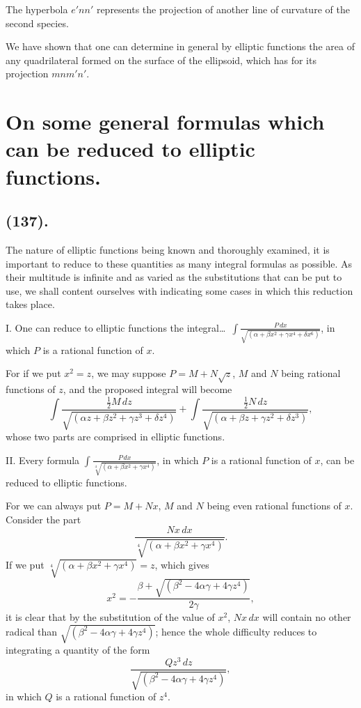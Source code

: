 \documentclass{article}
\begin{document}
The hyperbola $e'nn'$ represents the projection of another line of curvature of the second species.

We have shown that one can determine in general by elliptic functions the area of any quadrilateral formed on the surface of the ellipsoid, which has for its projection $mnm'n'$.

\section*{On some general formulas which can be reduced to elliptic functions.}

\subsection*{(137).}

The nature of elliptic functions being known and thoroughly examined, it is important to reduce to these quantities as many integral formulas as possible. As their multitude is infinite and as varied as the substitutions that can be put to use, we shall content ourselves with indicating some cases in which this reduction takes place.

I. One can reduce to elliptic functions the integral\ldots\ $\displaystyle\int\frac{P\,dx}{\sqrt{(\alpha+\beta x^{2}+\gamma x^{4}+\delta x^{6})}}$, in which $P$ is a rational function of $x$.

For if we put $x^{2}=z$, we may suppose $P=M+N\sqrt{z}$, $M$ and $N$ being rational functions of $z$, and the proposed integral will become
\[ \int\frac{\tfrac{1}{2}M\,dz}{\sqrt{(\alpha z+\beta z^{2}+\gamma z^{3}+\delta z^{4})}}+\int\frac{\tfrac{1}{2}N\,dz}{\sqrt{(\alpha+\beta z+\gamma z^{2}+\delta z^{3})}}, \]
whose two parts are comprised in elliptic functions.

II. Every formula $\displaystyle\int\frac{P\,dx}{\sqrt[4]{(\alpha+\beta x^{2}+\gamma x^{4})}}$, in which $P$ is a rational function of $x$, can be reduced to elliptic functions.

For we can always put $P=M+Nx$, $M$ and $N$ being even rational functions of $x$. Consider the part
\[ \frac{Nx\,dx}{\sqrt[4]{(\alpha+\beta x^{2}+\gamma x^{4})}}. \]
If we put $\sqrt[4]{(\alpha+\beta x^{2}+\gamma x^{4})}=z$, which gives
\[ x^{2}=-\frac{\beta+\sqrt{(\beta^{2}-4\alpha\gamma+4\gamma z^{4})}}{2\gamma}, \]
it is clear that by the substitution of the value of $x^{2}$, $Nx\,dx$ will contain no other radical than $\sqrt{(\beta^{2}-4\alpha\gamma+4\gamma z^{4})}$; hence the whole difficulty reduces to integrating a quantity of the form
\[ \frac{Qz^{3}\,dz}{\sqrt{(\beta^{2}-4\alpha\gamma+4\gamma z^{4})}}, \]
in which $Q$ is a rational function of $z^{4}$.
\end{document}
